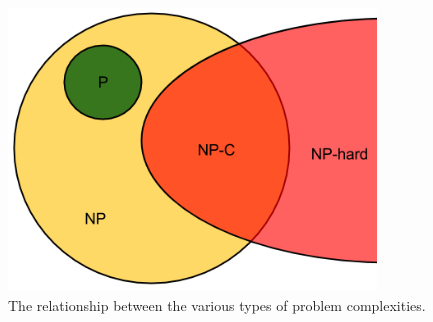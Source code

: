 \begin{figure}[H]
  \begin{center}
    \includegraphics[height=7.5cm]{./chapters/1-intro/figs/complexity.png}
  \caption{The relationship between the various types of problem complexities.}
  \label{fig:complexity}
  \end{center}
\end{figure}
